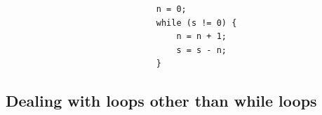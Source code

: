 \documentclass[12pt]{gatech-thesis}
\begin{document}
\small
\begin{verbatim}
                              n = 0;
                              while (s != 0) {
                                  n = n + 1;
                                  s = s - n;
                              }
\end{verbatim}
\normalsize

\subsection{Dealing with loops other than while loops}
\label{sec:other-loops}
\end{document}

